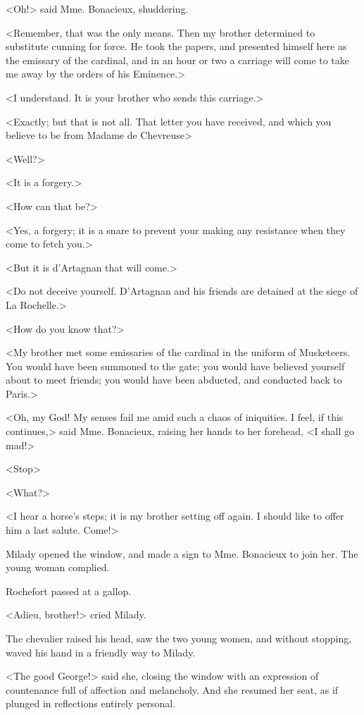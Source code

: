 <Oh!> said Mme. Bonacieux, shuddering. 

<Remember, that was the only means. Then my brother determined to substitute cunning for force. He took the papers, and presented himself here as the emissary of the cardinal, and in an hour or two a carriage will come to take me away by the orders of his Eminence.> 

<I understand. It is your brother who sends this carriage.> 

<Exactly; but that is not all. That letter you have received, and which you believe to be from Madame de Chevreuse\longdash> 

<Well?> 

<It is a forgery.> 

<How can that be?> 

<Yes, a forgery; it is a snare to prevent your making any resistance when they come to fetch you.> 

<But it is d'Artagnan that will come.> 

<Do not deceive yourself. D'Artagnan and his friends are detained at the siege of La Rochelle.> 

<How do you know that?> 

<My brother met some emissaries of the cardinal in the uniform of Musketeers. You would have been summoned to the gate; you would have believed yourself about to meet friends; you would have been abducted, and conducted back to Paris.> 

<Oh, my God! My senses fail me amid such a chaos of iniquities. I feel, if this continues,> said Mme. Bonacieux, raising her hands to her forehead, <I shall go mad!> 

<Stop\longdash> 

<What?> 

<I hear a horse's steps; it is my brother setting off again. I should like to offer him a last salute. Come!> 

Milady opened the window, and made a sign to Mme. Bonacieux to join her. The young woman complied. 

Rochefort passed at a gallop. 

<Adieu, brother!> cried Milady. 

The chevalier raised his head, saw the two young women, and without stopping, waved his hand in a friendly way to Milady. 

<The good George!> said she, closing the window with an expression of countenance full of affection and melancholy. And she resumed her seat, as if plunged in reflections entirely personal. 

